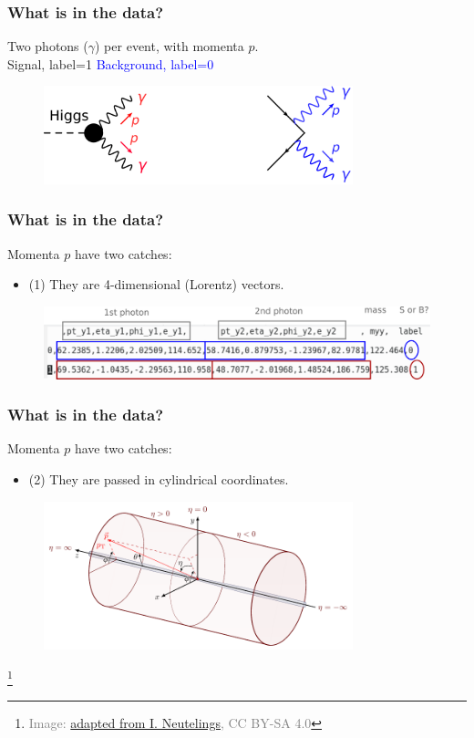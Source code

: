 \documentclass[11pt,xcolor=dvipsnames,aspectratio=169]{beamer}
\newcommand\blfootnote[1]{%
  \begingroup
  \renewcommand\thefootnote{}\footnote{\hspace{-30pt}\textcolor{Gray}{\tiny #1}}%
  \addtocounter{footnote}{-1}%
  \endgroup
}
\begin{document}
\begin{frame}
  \frametitle{\bf What is in the data?}
  \begin{center}
    Two photons ($\gamma$) per event, with momenta $p$.\\
    \vspace{20pt}
  \textcolor{EDBRed}{\Large Signal, label=1} \hspace{0.25\textwidth}
  \textcolor{Blue}{\Large Background, label=0}
  \end{center}
      \begin{figure}
        \includegraphics[width=0.80\textwidth]{figures/l1/challenge/SvsB.png}
      \end{figure}     
\end{frame}

\begin{frame}
  \frametitle{\bf What is in the data?}
  Momenta $p$ have two catches:
  \vfill
  \begin{itemize}
  \item (1) They are 4-dimensional (Lorentz) vectors.
  \end{itemize}
  \begin{figure}
    \includegraphics[width=1.00\textwidth]{figures/l1/challenge/data_annot.png}
  \end{figure}
\end{frame}

\begin{frame}
  \frametitle{\bf What is in the data?}
  Momenta $p$ have two catches:
  \vfill
  \begin{itemize}    
  \item (2) They are passed in cylindrical coordinates.
  \end{itemize}
  \begin{figure}
    \centering
    \includegraphics[width=0.80\textwidth]{figures/l1/challenge/coordinate_system.pdf}
  \end{figure}
\blfootnote{Image: \href{https://tikz.net/axis3d_cms/}{adapted from I.
    Neutelings}, CC BY-SA 4.0}
\end{frame}
\end{document}
